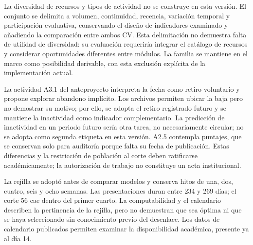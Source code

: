 La diversidad de recursos y tipos de actividad no se construye en esta versión. El conjunto se delimita a volumen, continuidad, recencia, variación temporal y participación evaluativa, conservando el diseño de indicadores examinado y añadiendo la comparación entre ambos CV. Esta delimitación no demuestra falta de utilidad de diversidad: su evaluación requeriría integrar el catálogo de recursos y considerar oportunidades diferentes entre módulos. La familia se mantiene en el marco como posibilidad derivable, con esta exclusión explícita de la implementación actual.

La actividad A3.1 del anteproyecto interpreta la fecha como retiro voluntario y propone explorar abandono implícito. Los archivos permiten ubicar la baja pero no demostrar su motivo; por ello, se adopta el retiro registrado futuro y se mantiene la inactividad como indicador complementario. La predicción de inactividad en un periodo futuro sería otra tarea, no necesariamente circular; no se adopta como segunda etiqueta en esta versión. A2.5 contempla puntajes, que se conservan solo para auditoría porque falta su fecha de publicación. Estas diferencias y la restricción de población al corte deben ratificarse académicamente; la autorización de trabajo no constituye un acta institucional.

La rejilla se adoptó antes de comparar modelos y conserva hitos de una, dos, cuatro, seis y ocho semanas. Las presentaciones duran entre 234 y 269 días; el corte 56 cae dentro del primer cuarto. La computabilidad y el calendario describen la pertinencia de la rejilla, pero no demuestran que sea óptima ni que se haya seleccionado sin conocimiento previo del desenlace. Los datos de calendario publicados permiten examinar la disponibilidad académica, presente ya al día 14.

